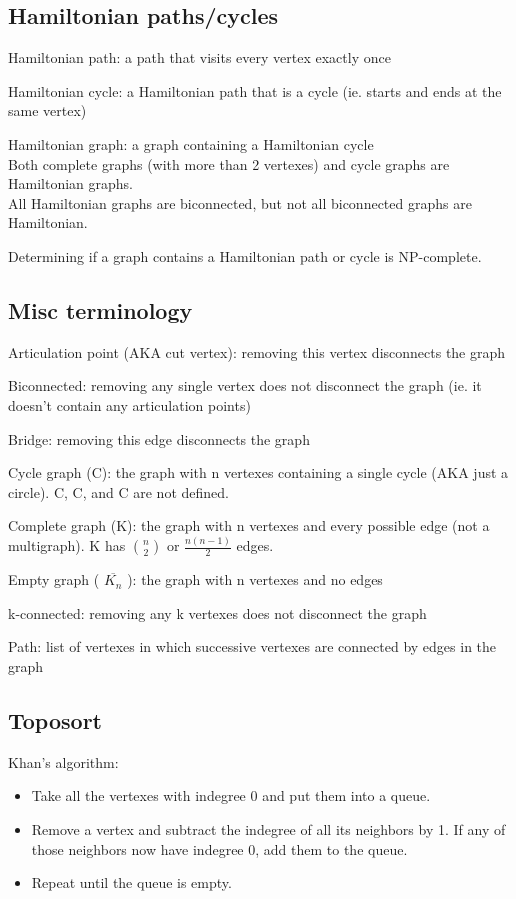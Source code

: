 \subsection*{Hamiltonian paths/cycles} 

Hamiltonian path: a path that visits every vertex exactly once

Hamiltonian cycle: a Hamiltonian path that is a cycle (ie. starts and ends at the same vertex)

Hamiltonian graph: a graph containing a Hamiltonian cycle \\
\indent Both complete graphs (with more than 2 vertexes) and cycle graphs are Hamiltonian graphs. \\
\indent All Hamiltonian graphs are biconnected, but not all biconnected graphs are Hamiltonian.

Determining if a graph contains a Hamiltonian path or cycle is NP-complete.

\subsection*{Misc terminology}

Articulation point (AKA cut vertex): removing this vertex disconnects the graph

Biconnected: removing any single vertex does not disconnect the graph (ie. it doesn't contain any articulation points)

Bridge: removing this edge disconnects the graph

Cycle graph (C): the graph with n vertexes containing a single cycle (AKA just a circle). C, C, and C are not defined.

Complete graph (K): the graph with n vertexes and every possible edge (not a multigraph). K has $\binom{n}{2}$ or $\frac{n(n-1)}{2}$ edges.

Empty graph ( $\overline{K_n}$ ): the graph with n vertexes and no edges

k-connected: removing any k vertexes does not disconnect the graph

Path: list of vertexes in which successive vertexes are connected by edges in the graph

\subsection*{Toposort}

Khan's algorithm: 
\begin{itemize}
    \item Take all the vertexes with indegree 0 and put them into a queue.
    \item Remove a vertex and subtract the indegree of all its neighbors by 1. If any of those neighbors now have indegree 0, add them to the queue.
    \item Repeat until the queue is empty.
\end{itemize}

